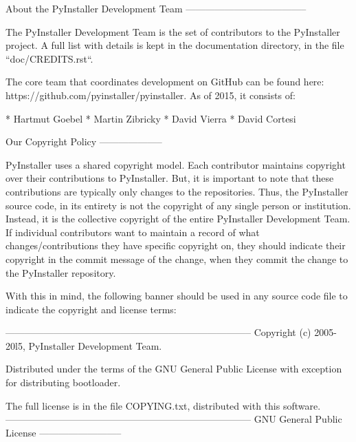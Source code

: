 About the PyInstaller Development Team\newline
--------------------------------------

The PyInstaller Development Team is the set of contributors
to the PyInstaller project. A full list with details is kept
in the documentation directory, in the file
``doc/CREDITS.rst``.

The core team that coordinates development on GitHub can be found here:\newline
https://github.com/pyinstaller/pyinstaller.  As of 2015, it consists of:

* Hartmut Goebel\newline
* Martin Zibricky\newline
* David Vierra\newline
* David Cortesi

Our Copyright Policy\newline
--------------------

PyInstaller uses a shared copyright model. Each contributor maintains copyright
over their contributions to PyInstaller. But, it is important to note that these
contributions are typically only changes to the repositories. Thus,
the PyInstaller source code, in its entirety is not the copyright of any single
person or institution.  Instead, it is the collective copyright of the entire
PyInstaller Development Team.  If individual contributors want to maintain
a record of what changes/contributions they have specific copyright on, they
should indicate their copyright in the commit message of the change, when they
commit the change to the PyInstaller repository.

With this in mind, the following banner should be used in any source code file
to indicate the copyright and license terms:

-----------------------------------------------------------------------------\newline
Copyright (c) 2005-20l5, PyInstaller Development Team.

Distributed under the terms of the GNU General Public License with exception
for distributing bootloader.

The full license is in the file COPYING.txt, distributed with this software.\newline
-----------------------------------------------------------------------------
\newpage
GNU General Public License\newline
--------------------------

